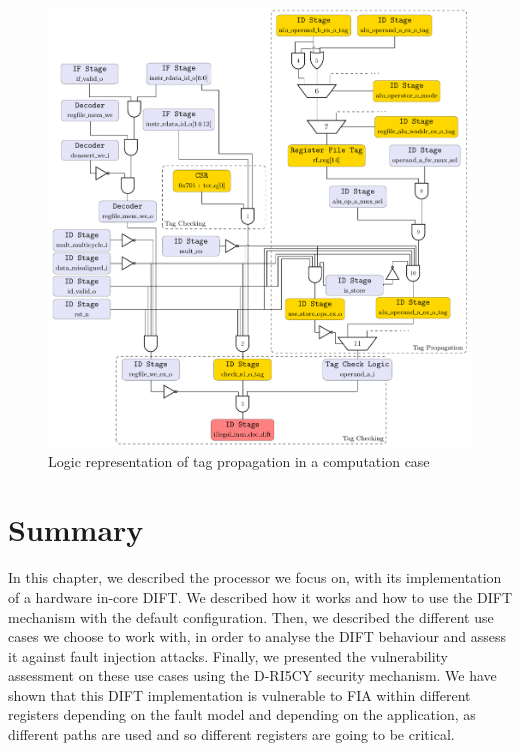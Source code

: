 \begin{figure}[ht]
    \centering
    \includegraphics[width=\textwidth]{c3_vulnerabilities_assessment/img/comp_compu/arborescence_propagation.pdf}
    \caption{Logic representation of tag propagation in a computation case}
    \label{fig:attack_propag_v3_tag_propagation}
\end{figure}


\section{Summary}
In this chapter, we described the processor we focus on, with its implementation of a hardware in-core DIFT. We described how it works and how to use the DIFT mechanism with the default configuration. Then, we described the different use cases we choose to work with, in order to analyse the DIFT behaviour and assess it against fault injection attacks. Finally, we presented the vulnerability assessment on these use cases using the D-RI5CY security mechanism. We have shown that this DIFT implementation is vulnerable to FIA within different registers depending on the fault model and depending on the application, as different paths are used and so different registers are going to be critical.
